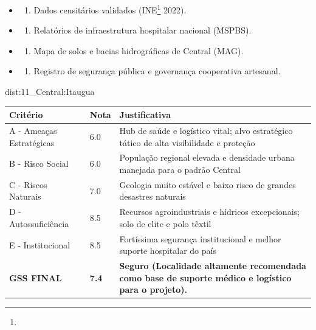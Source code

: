 {\begin{itemize}
\tightlist
\item
  \begin{enumerate}
  \def\labelenumi{\arabic{enumi})}
  \tightlist
  \item
    Dados censitários validados (INE\footnote{\fineINE} 2022).
  \end{enumerate}
\item
  \begin{enumerate}
  \def\labelenumi{\arabic{enumi})}
  \setcounter{enumi}{1}
  \tightlist
  \item
    Relatórios de infraestrutura hospitalar nacional (MSPBS).
  \end{enumerate}
\item
  \begin{enumerate}
  \def\labelenumi{\arabic{enumi})}
  \setcounter{enumi}{2}
  \tightlist
  \item
    Mapa de solos e bacias hidrográficas de Central (MAG).
  \end{enumerate}
\item
  \begin{enumerate}
  \def\labelenumi{\arabic{enumi})}
  \setcounter{enumi}{3}
  \tightlist
  \item
    Registro de segurança pública e governança cooperativa artesanal.
  \end{enumerate}
\end{itemize}}{dist:11_Central:Itaugua}
\begin{table}[ht!]
\small \begin{tabular}{p{3.0cm}p{0.8cm}p{6.0cm}} \toprule
\textbf{Critério} & \textbf{Nota} & \textbf{Justificativa} \\ \midrule
A - Ameaças Estratégicas & 6.0 & Hub de saúde e logístico vital; alvo estratégico tático de alta visibilidade e proteção \\
B - Risco Social & 6.0 & População regional elevada e densidade urbana manejada para o padrão Central \\
C - Riscos Naturais & 7.0 & Geologia muito estável e baixo risco de grandes desastres naturais \\
D - Autossuficiência & 8.5 & Recursos agroindustriais e hídricos excepcionais; solo de elite e polo têxtil \\
E - Institucional & 8.5 & Fortíssima segurança institucional e melhor suporte hospitalar do país \\
\midrule \textbf{GSS FINAL} & \textbf{7.4} & \textbf{Seguro (Localidade altamente recomendada como base de suporte médico e logístico para o projeto).} \\ \bottomrule \end{tabular}
\end{table}
